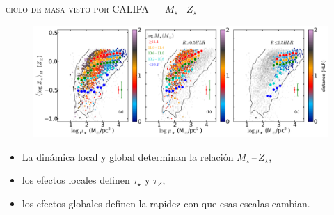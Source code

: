 \documentclass[xcolor=dvipsnames,4pt,fleqn,hyperref={colorlinks,citecolor=black,linkcolor=black,urlcolor=black}]{beamer}
\begin{document}
\begin{frame}{\textsc{ciclo de masa visto por CALIFA --- $M_\star\,$--$\,Z_\star$}}

\begin{figure}
\flushleft\citep{Gonzalez2014b}
\includegraphics[width=\textwidth]{img/gonzalez2014b-3}
\end{figure}
\begin{itemize}
\setlength\itemsep{0.5em}
\item La dinámica local y global determinan la relación $M_\star\,$--$\,Z_\star$,
\item los efectos locales definen $\tau_\star$ y $\tau_Z$,
\item los efectos globales definen la rapidez con que esas escalas cambian.
\end{itemize}
\end{frame}
\end{document}
